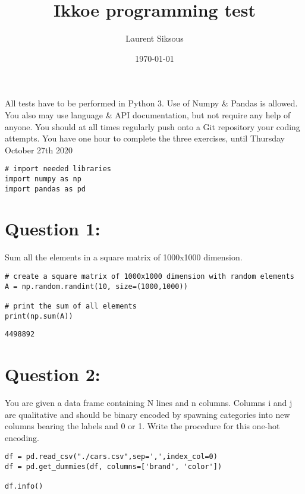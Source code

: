 \documentclass[11pt]{article}
\author{Laurent Siksous}
\date{\today}
\title{Ikkoe programming test}
\begin{document}
\maketitle
All tests have to be performed in Python 3. Use of Numpy \& Pandas is allowed. You also may use 
language \& API documentation, but not require any help of anyone.
You should at all times regularly push onto a Git repository your coding attempts.
You have one hour to complete the three exercises, until Thursday October 27th 2020

\begin{verbatim}
# import needed libraries
import numpy as np
import pandas as pd 
\end{verbatim}

\section{Question 1:}
\label{sec:org601306e}
Sum all the elements in a square matrix of 1000x1000 dimension.

\begin{verbatim}
# create a square matrix of 1000x1000 dimension with random elements
A = np.random.randint(10, size=(1000,1000))

# print the sum of all elements
print(np.sum(A))
\end{verbatim}

\begin{verbatim}
4498892
\end{verbatim}

\section{Question 2:}
\label{sec:org530f949}
You are given a data frame containing N lines and n columns. Columns i and j are qualitative and 
should be binary encoded by spawning categories into new columns bearing the labels and 0 or 1. 
Write the procedure for this one-hot encoding.

\begin{verbatim}
df = pd.read_csv("./cars.csv",sep=',',index_col=0)
df = pd.get_dummies(df, columns=['brand', 'color'])

df.info()
\end{verbatim}
\end{document}
